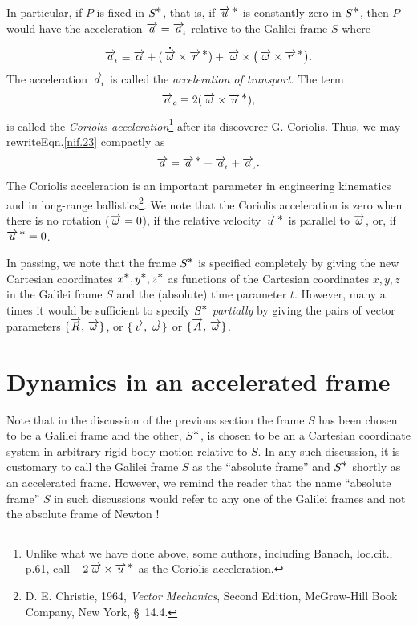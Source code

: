 In particular, if $P$ is fixed in $S^{\textstyle \ast}$, that is, if 
${\overrightarrow{u}^{\,{\textstyle \ast}}}$ is constantly zero in $S^{\textstyle \ast}$, then $P$ 
would have the acceleration $\overrightarrow{a}=\overrightarrow{a}_{{_{\hspace*{-1.5pt}{t}}}}$ 
relative to the Galilei frame $S $ where
\begin{align}\label{nif.24}
\overrightarrow{a}_{{_{\hspace*{-1.5pt}{t}}}}\equiv\overrightarrow{\alpha}
+({\overset{\hspace*{1.5pt}\centerdot}{\,\overrightarrow{{\omega}}} }\times {\overrightarrow{r}^{\,{\ensuremath{\textstyle \ast}}}}) +
\,\overrightarrow{{\omega}}\times \big( \,\overrightarrow{{\omega}} \times
\overrightarrow{r}^{\,{\textstyle \ast}} \big ).
\end{align}
The acceleration $\overrightarrow{a}_{{_{\hspace*{-1.5pt}{t}}}}$ is called the 
\textsl{acceleration of transport}. The term
\begin{align}\label{nif.25}
\overrightarrow{a}_{c}\equiv2(\,\overrightarrow{{\omega}}\times{\overrightarrow{u}^{\,{\ensuremath{\textstyle \ast}}}}),
\end{align}
is called the \textsl{Coriolis 
acceleration}\footnote{Unlike 
what we have done above, some authors, including Banach, 
loc.cit., p.61, call $-2 \,\overrightarrow{{\omega}}\times{\overrightarrow{u}^{\,{\ensuremath{\textstyle \ast}}}}$ as the 
Coriolis acceleration.} after its discoverer G. Coriolis. 
Thus, we may rewriteEqn.\eqref{nif.23} compactly as
\begin{align}\label{nif.26}
\overrightarrow{a}={\overrightarrow{a}^{\,{\textstyle \ast}}}+\overrightarrow{a}_{{_{\hspace*{-1.5pt}{t}}}}
+\overrightarrow{a}_{{_{\hspace*{-1.5pt}{c}}}}.
\end{align}
The Coriolis acceleration is an important parameter in 
engineering kinematics and in long-range 
ballistics\footnote{D. E. Christie, 1964, 
\textsl{Vector Mechanics}, Second Edition, McGraw-Hill 
Book Company, New York, \S~14.4.}. We note that the 
Coriolis acceleration is zero when there is no rotation 
($\overrightarrow{{\omega}}=0$), if the relative velocity ${\overrightarrow{u}^{\,{\textstyle \ast}}}$ 
is parallel to $\overrightarrow{{\omega}}$, or, if ${\overrightarrow{u}^{\,{\textstyle \ast}}}=0$.

In passing, we note that the frame $S^{\textstyle \ast}$ is 
specified completely by giving the new Cartesian 
coordinates $x^{{\textstyle \ast}}, y^{{\textstyle \ast}},z^{{\textstyle \ast}}$ as functions 
of the Cartesian coordinates $x,y,z$ in the Galilei 
frame $S$ and the (absolute) time parameter $t$. 
However, many a times it would be sufficient to specify 
$S^{\textstyle \ast}$ \textsl{partially} by giving the pairs of 
vector parameters $\{\overrightarrow{R},\,\overrightarrow{{\omega}}\}$, or 
$\{\overrightarrow{v},\,\overrightarrow{{\omega}}\}$ or $\{\overrightarrow{A},\, 
\overrightarrow{{\omega}}\}$.

\section{Dynamics in an accelerated frame} Note that  
in the discussion of the previous section the frame 
$S$ has been chosen to be a Galilei frame and the 
other, $S^{\textstyle \ast}$, is chosen to be an a Cartesian 
coordinate system in arbitrary rigid body motion 
relative to $S$. In any such discussion, it is 
customary to call the Galilei frame $S$ as the 
``absolute frame'' and $S^{\textstyle \ast}$ shortly as an 
accelerated frame. However, we remind the reader that 
the name ``absolute frame'' $S$ in such discussions 
would refer to any one of the Galilei frames and not 
the absolute frame of Newton !

